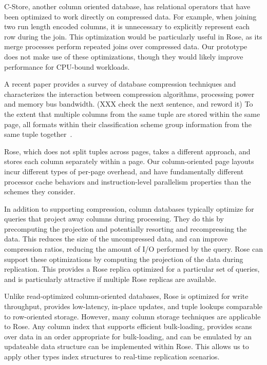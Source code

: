 \documentclass{vldb}
\newcommand{\rows}{Rose\xspace}
\begin{document}
C-Store, another column oriented database, has relational operators
that have been optimized to work directly on compressed
data\cite{compExec}.  For example, when joining two run length encoded
columns, it is unnecessary to explicitly represent each row during the
join.  This optimization would be particularly useful in \rows, as its
merge processes perform repeated joins over compressed data.  Our
prototype does not make use of these optimizations, though they would
likely improve performance for CPU-bound workloads.

A recent paper provides a survey of database compression
techniques and characterizes the interaction between compression
algorithms, processing power and memory bus bandwidth.  (XXX check the next sentence, and reword it) To the extent
that multiple columns from the same tuple are stored within the same
page, all formats within their classification scheme group information
from the same tuple together~\cite{bitsForChronos}.

\rows, which does not split tuples across pages, takes a different
approach, and stores each column separately within a page.  Our
column-oriented page layouts incur different types of per-page overhead, and
have fundamentally different processor
cache behaviors and instruction-level parallelism properties than the
schemes they consider.

In addition to supporting compression, column databases typically
optimize for queries that project away columns during processing.
They do this by precomputing the projection and potentially resorting
and recompressing the data.  This reduces the size of the uncompressed
data, and can improve compression ratios, reducing the amount of I/O
performed by the query.  \rows can support these optimizations by
computing the projection of the data during replication.  This
provides a \rows replica optimized for a particular set of queries,
and is particularly attractive if multiple \rows replicas are
available.

Unlike read-optimized column-oriented databases, \rows is optimized
for write throughput, provides low-latency, in-place updates, and tuple lookups comparable to row-oriented storage.
However, many column storage techniques are applicable to \rows.  Any
column index that supports efficient bulk-loading, provides scans over data in an order appropriate for bulk-loading, and can be emulated by an
updateable data structure can be implemented within
\rows.  This allows us to apply other types index structures
to real-time replication scenarios.
\end{document}

